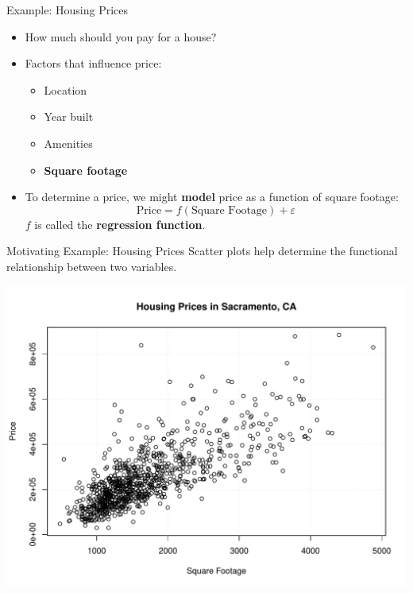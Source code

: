 \documentclass{beamer}
\begin{document}
\begin{frame}{Example: Housing Prices}
    \begin{itemize}[<+->]
        \item How much should you pay for a house?
        \item Factors that influence price:
        \begin{itemize}
            \item Location
            \item Year built
            \item Amenities
            \item \textbf{Square footage}
        \end{itemize}
        \item To determine a price, we might \textbf{model} price as a function of square footage:
        \begin{equation*}
            \textrm{Price} = f(\textrm{Square Footage}) + \varepsilon
        \end{equation*}
        $f$ is called the \textbf{regression function}.
    \end{itemize}
\end{frame}

\begin{frame}{Motivating Example: Housing Prices}
    Scatter plots help determine the functional relationship between two variables.
    \begin{center}
        \includegraphics[width=.85\linewidth]{figures/sacramento.pdf}
    \end{center}
\end{frame}
\end{document}
